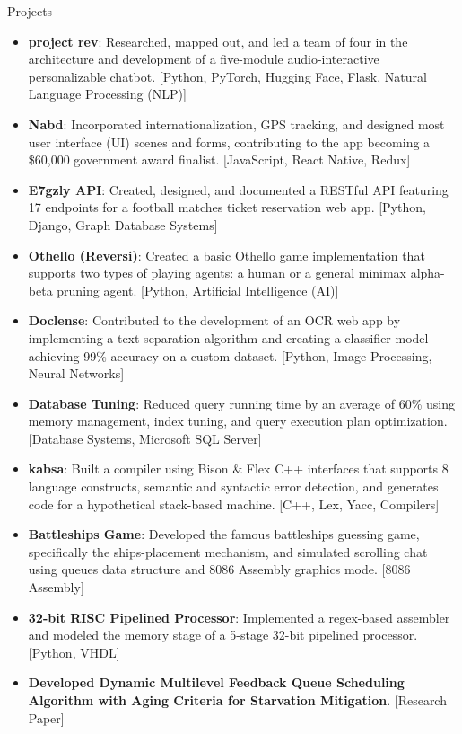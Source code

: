 \documentclass[]{mcdowellcv}
\begin{document}
	\begin{cvsection}{Projects}
		\begin{cvsubsection}{}{}{}
			\begin{itemize}
				\item \textbf{project rev}: Researched, mapped out, and led a team of four in the architecture and development of a five-module audio-interactive personalizable chatbot. [Python, PyTorch, Hugging Face, Flask, Natural Language Processing (NLP)]
				\item \textbf{Nabd}: Incorporated internationalization, GPS tracking, and designed most user interface (UI) scenes and forms, contributing to the app becoming a \$60,000 government award finalist. [JavaScript, React Native, Redux]
				\item \textbf{E7gzly API}: Created, designed, and documented a RESTful API featuring 17 endpoints for a football matches ticket reservation web app. [Python, Django, Graph Database Systems]
				\item \textbf{Othello (Reversi)}: Created a basic Othello game implementation that supports two types of playing agents: a human or a general minimax alpha-beta pruning agent. [Python, Artificial Intelligence (AI)]
				\item \textbf{Doclense}: Contributed to the development of an OCR web app by implementing a text separation algorithm and creating a classifier model achieving 99\% accuracy on a custom dataset. [Python, Image Processing, Neural Networks]
				\item \textbf{Database Tuning}: Reduced query running time by an average of 60\% using memory management, index tuning, and query execution plan optimization. [Database Systems, Microsoft SQL Server]
				\item \textbf{kabsa}: Built a compiler using Bison \& Flex C++ interfaces that supports 8 language constructs, semantic and syntactic error detection, and generates code for a hypothetical stack-based machine. [C++, Lex, Yacc, Compilers]
				\item \textbf{Battleships Game}: Developed the famous battleships guessing game, specifically the ships-placement mechanism, and simulated scrolling chat using queues data structure and 8086 Assembly graphics mode. [8086 Assembly]
				\item \textbf{32-bit RISC Pipelined Processor}: Implemented a regex-based assembler and modeled the memory stage of a 5-stage 32-bit pipelined processor. [Python, VHDL]
				\item \textbf{Developed Dynamic Multilevel Feedback Queue Scheduling Algorithm with Aging Criteria for Starvation Mitigation}. [Research Paper]
			\end{itemize}
		\end{cvsubsection}
	\end{cvsection}
	
\end{document}
